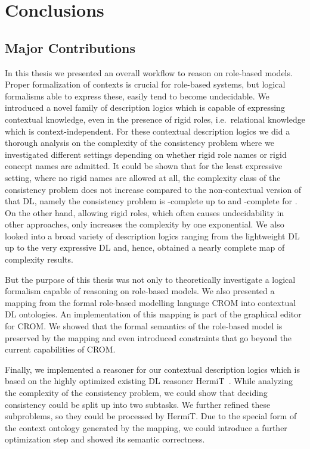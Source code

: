 \chapter{Conclusions}
\label{cha:conclusions}


\section{Major Contributions}
\label{sec:major-contributions}

In this thesis we presented an overall workflow to reason on role-based models. Proper formalization
of contexts is crucial for role-based systems, but logical formalisms able to express these, easily
tend to become undecidable.  We introduced a novel family of description logics which is capable of
expressing contextual knowledge, even in the presence of rigid roles, i.e.\ relational knowledge
which is context-independent.  For these contextual description logics we did a thorough analysis on
the complexity of the consistency problem where we investigated different settings depending on
whether rigid role names or rigid concept names are admitted. It could be shown that for the least
expressive setting, where no rigid names are allowed at all, the complexity class of the consistency
problem does not increase compared to the non-contextual version of that DL, namely the consistency
problem is \ExpTime-complete up to \SHOQSHOQ and \NExpTime-complete for \SHOIQSHOIQ. On the other
hand, allowing rigid roles, which often causes undecidability in other approaches, only increases
the complexity by one exponential.
%
We also looked into a broad variety of description logics
ranging from the lightweight DL \EL up to the very expressive DL \SHOIQ and, hence, obtained a
nearly complete map of complexity results.

But the purpose of this thesis was not only to theoretically investigate a logical formalism capable
of reasoning on role-based models. We also presented a mapping from the formal role-based modelling
language CROM into contextual DL ontologies. An implementation of this mapping is part of the
graphical editor for CROM. We showed that the formal semantics of the role-based model is preserved
by the mapping and even introduced constraints that go beyond the current capabilities of CROM. 

Finally, we implemented a reasoner for our contextual description logics which is based on the
highly optimized existing DL reasoner HermiT~\cite{GHM-JAR14}.  While analyzing the complexity of
the consistency problem, we could show that deciding consistency could be split up into two
subtasks. We further refined these subproblems, so they could be processed by HermiT.  Due to the
special form of the context ontology generated by the mapping, we could introduce a further
optimization step and showed its semantic correctness.




